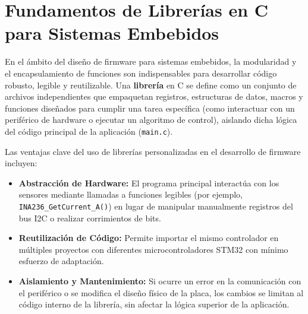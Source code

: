\documentclass[
10pt, %
a4paper, %
oneside, %
headinclude,footinclude, %
BCOR5mm, %
]{scrartcl}
\begin{document}




\newpage %
\section{Fundamentos de Librerías en C para Sistemas Embebidos}

En el ámbito del diseño de firmware para sistemas embebidos, la modularidad y el encapsulamiento de funciones son indispensables para desarrollar código robusto, legible y reutilizable. Una \textbf{librería} en C se define como un conjunto de archivos independientes que empaquetan registros, estructuras de datos, macros y funciones diseñados para cumplir una tarea específica (como interactuar con un periférico de hardware o ejecutar un algoritmo de control), aislando dicha lógica del código principal de la aplicación (\texttt{main.c}).

Las ventajas clave del uso de librerías personalizadas en el desarrollo de firmware incluyen:
\begin{itemize}
	\item \textbf{Abstracción de Hardware:} El programa principal interactúa con los sensores mediante llamadas a funciones legibles (por ejemplo, \texttt{INA236\_GetCurrent\_A()}) en lugar de manipular manualmente registros del bus I2C o realizar corrimientos de bits.
	\item \textbf{Reutilización de Código:} Permite importar el mismo controlador en múltiples proyectos con diferentes microcontroladores STM32 con mínimo esfuerzo de adaptación.
	\item \textbf{Aislamiento y Mantenimiento:} Si ocurre un error en la comunicación con el periférico o se modifica el diseño físico de la placa, los cambios se limitan al código interno de la librería, sin afectar la lógica superior de la aplicación.
\end{itemize}
\end{document}
